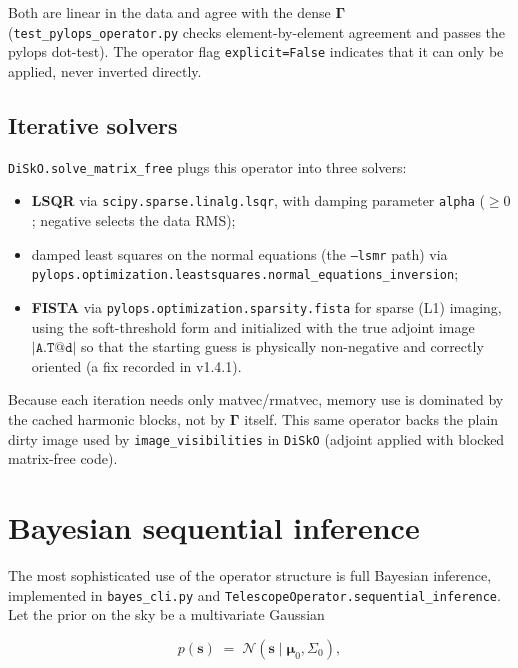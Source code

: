 \documentclass[11pt,a4paper]{article}
\newcommand{\Gammam}{\boldsymbol{\Gamma}}
\newcommand{\svec}{\boldsymbol{s}}
\begin{document}
Both are linear in the data and agree with the dense $\Gammam$
(\texttt{test\_pylops\_operator.py} checks element-by-element agreement and
passes the pylops dot-test). The operator flag \texttt{explicit=False}
indicates that it can only be applied, never inverted directly.

\subsection{Iterative solvers}

\texttt{DiSkO.solve\_matrix\_free} plugs this operator into three solvers:

\begin{itemize}
  \item \textbf{LSQR} \cite{paige1982} via
    \texttt{scipy.sparse.linalg.lsqr}, with damping parameter
    \texttt{alpha} ($\ge0$; negative selects the data RMS);
  \item damped least squares on the normal equations (the
    \texttt{--lsmr} path) via
    \texttt{pylops.optimization.leastsquares.normal\_equations\_inversion};
  \item \textbf{FISTA} \cite{beck2009} via
    \texttt{pylops.optimization.sparsity.fista} for sparse (L1) imaging, using
    the soft-threshold form and initialized with the true adjoint image
    $|\texttt{A.T} @ \texttt{d}|$ so that the starting guess is physically
    non-negative and correctly oriented (a fix recorded in v1.4.1).
\end{itemize}

Because each iteration needs only matvec/rmatvec, memory use is dominated by
the cached harmonic blocks, not by $\Gammam$ itself. This same operator backs
the plain dirty image used by \texttt{image\_visibilities} in \texttt{DiSkO}
(adjoint applied with blocked matrix-free code).

\section{Bayesian sequential inference}
\label{sec:bayes}

The most sophisticated use of the operator structure is full Bayesian
inference, implemented in \texttt{bayes\_cli.py} and
\texttt{TelescopeOperator.sequential\_inference}. Let the prior on the sky be a
multivariate Gaussian

\begin{equation}
  p(\svec)\;=\;\mathcal{N}(\svec\mid \boldsymbol{\mu}_0,\Sigma_0),
\end{equation}
\end{document}

